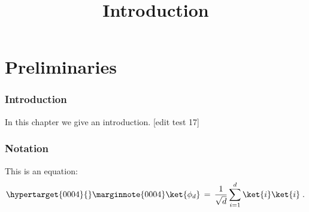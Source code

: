 

%
\usepackage{marginnote}


\title{Introduction}
\hypertarget{0000}{}
\reversemarginpar{}
\label{introduction}


\maketitle


\tableofcontents

\part{Preliminaries}
\hypertarget{0001}{}
\reversemarginpar{}
\label{book-part-preliminaries}

\hypertarget{0002}{}
\reversemarginpar{}
\section{Introduction}
\label{section:introduction}

In this chapter we give an introduction. [edit test 17]

\hypertarget{0003}{}
\reversemarginpar{}
\section{Notation}
\label{section-notation}

This is an equation:
\begin{equation}
\hypertarget{0004}{}
\reversemarginpar\marginnote{\textnormal{0004}}
\label{eq:me-state}
 \ket{\phi_d} \,=\,\frac{1}{\sqrt{d}} \sum_{i=1}^d \ket{i}\ket{i}\;.
\end{equation}








